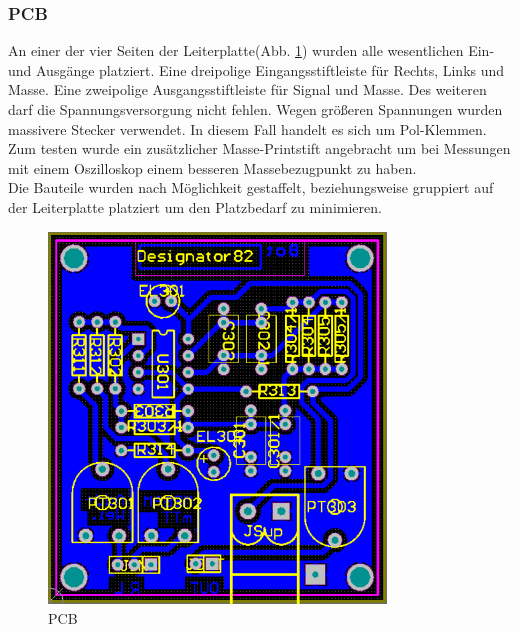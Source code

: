 \subsubsection{PCB}
An einer der vier Seiten der Leiterplatte(Abb. \ref{fig:abb3.5}) wurden alle wesentlichen Ein- und Ausgänge platziert. Eine dreipolige Eingangsstiftleiste für Rechts, Links und Masse. Eine zweipolige Ausgangsstiftleiste für Signal und Masse. Des weiteren darf die Spannungsversorgung nicht fehlen. Wegen größeren Spannungen wurden massivere Stecker verwendet. In diesem Fall handelt es sich um Pol-Klemmen. Zum testen wurde ein zusätzlicher Masse-Printstift angebracht um bei Messungen mit einem Oszilloskop einem besseren Massebezugpunkt zu haben.\\
Die Bauteile wurden nach Möglichkeit gestaffelt, beziehungsweise gruppiert auf der Leiterplatte platziert um den Platzbedarf zu minimieren.
\begin{figure} [h]
	\centering
	\caption{PCB}
	\label {fig:abb3.5}
	\includegraphics[width=0.8\textwidth]{img/3mTTWeicheruAddierer-PCB.PNG}
\end{figure}



